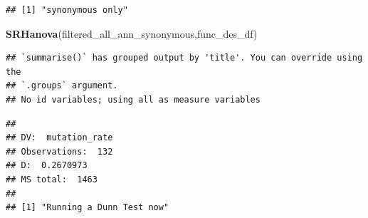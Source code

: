 \documentclass[
]{article}
\newenvironment{Shaded}{\begin{snugshade}}{\end{snugshade}}
\newcommand{\KeywordTok}[1]{\textcolor[rgb]{0.13,0.29,0.53}{\textbf{#1}}}
\newcommand{\NormalTok}[1]{#1}
\newcommand{\OperatorTok}[1]{\textcolor[rgb]{0.81,0.36,0.00}{\textbf{#1}}}
\newcommand{\StringTok}[1]{\textcolor[rgb]{0.31,0.60,0.02}{#1}}
\begin{document}
\begin{Shaded}
\end{Shaded}

\begin{verbatim}
## [1] "synonymous only"
\end{verbatim}

\begin{Shaded}
\begin{Highlighting}[]
\KeywordTok{SRHanova}\NormalTok{(filtered_all_ann_synonymous,func_des_df)}
\end{Highlighting}
\end{Shaded}

\begin{verbatim}
## `summarise()` has grouped output by 'title'. You can override using the
## `.groups` argument.
## No id variables; using all as measure variables
\end{verbatim}

\begin{verbatim}
## 
## DV:  mutation_rate 
## Observations:  132 
## D:  0.2670973 
## MS total:  1463 
## 
## [1] "Running a Dunn Test now"
\end{verbatim}
\end{document}
